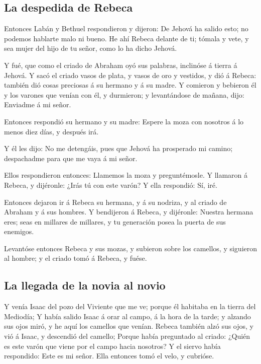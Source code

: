 \hypertarget{la-despedida-de-rebeca}{%
\subsection{La despedida de Rebeca}\label{la-despedida-de-rebeca}}

 Entonces Labán y Bethuel respondieron y dijeron: De
Jehová ha salido esto; no podemos hablarte malo ni bueno.
 He ahí Rebeca delante de ti; tómala y vete, y sea mujer
del hijo de tu señor, como lo ha dicho Jehová.

 Y fué, que como el criado de Abraham oyó sus palabras,
inclinóse á tierra á Jehová.  Y sacó el criado vasos de
plata, y vasos de oro y vestidos, y dió á Rebeca: también dió cosas
preciosas á su hermano y á su madre.  Y comieron y
bebieron él y los varones que venían con él, y durmieron; y levantándose
de mañana, dijo: Enviadme á mi señor.

 Entonces respondió su hermano y su madre: Espere la moza
con nosotros á lo menos diez días, y después irá.

 Y él les dijo: No me detengáis, pues que Jehová ha
prosperado mi camino; despachadme para que me vaya á mi señor.

 Ellos respondieron entonces: Llamemos la moza y
preguntémosle.  Y llamaron á Rebeca, y dijéronle: ¿Irás
tú con este varón? Y ella respondió: Sí, iré.

 Entonces dejaron ir á Rebeca su hermana, y á su nodriza,
y al criado de Abraham y á sus hombres.  Y bendijeron á
Rebeca, y dijéronle: Nuestra hermana eres; seas en millares de millares,
y tu generación posea la puerta de sus enemigos.

 Levantóse entonces Rebeca y sus mozas, y subieron sobre
los camellos, y siguieron al hombre; y el criado tomó á Rebeca, y fuése.

\hypertarget{la-llegada-de-la-novia-al-novio}{%
\subsection{La llegada de la novia al
novio}\label{la-llegada-de-la-novia-al-novio}}

 Y venía Isaac del pozo del Viviente que me ve; porque él
habitaba en la tierra del Mediodía;  Y había salido Isaac
á orar al campo, á la hora de la tarde; y alzando sus ojos miró, y he
aquí los camellos que venían.  Rebeca también alzó sus
ojos, y vió á Isaac, y descendió del camello;  Porque
había preguntado al criado: ¿Quién es este varón que viene por el campo
hacia nosotros? Y el siervo había respondido: Este es mi señor. Ella
entonces tomó el velo, y cubrióse.

